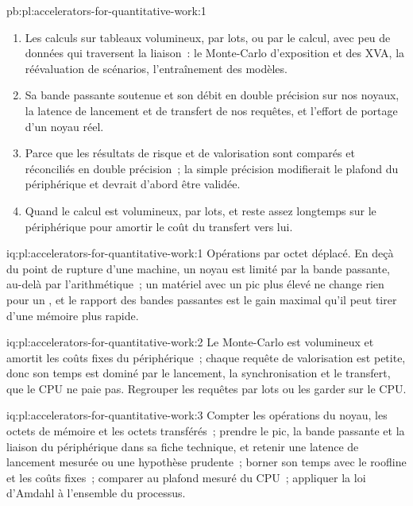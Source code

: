 \begin{solution}{pb:pl:accelerators-for-quantitative-work:1}
\begin{enumerate}
latence de lancement de 10~microsecondes.
\item Les calculs sur tableaux volumineux, par lots,  ou par le calcul, avec peu de données qui traversent la liaison~: le Monte-Carlo d'exposition et des XVA, la réévaluation de scénarios,
l'entraînement des modèles.
\item Sa bande passante soutenue et son débit en double précision sur nos noyaux, la latence de lancement et de transfert de nos requêtes, et l'effort de
portage d'un noyau réel.
\item Parce que les résultats de risque et de valorisation sont comparés et réconciliés en double précision~; la simple précision modifierait le plafond du périphérique et
devrait d'abord être validée.
\item Quand le calcul est volumineux, par lots, et reste assez longtemps sur le périphérique pour amortir le coût du transfert vers lui.
\end{enumerate}
\end{solution}

\begin{solution}{iq:pl:accelerators-for-quantitative-work:1}
Opérations par octet déplacé. En deçà du point de rupture d'une machine, un noyau est limité par la bande passante, au-delà par l'arithmétique~; un matériel avec un pic plus élevé
ne change rien pour un , et le rapport des bandes passantes est le gain maximal qu'il peut tirer d'une mémoire plus rapide.
\end{solution}

\begin{solution}{iq:pl:accelerators-for-quantitative-work:2}
Le Monte-Carlo est volumineux et amortit les coûts fixes du périphérique~; chaque requête de valorisation est petite, donc son temps est dominé par le lancement,
la synchronisation et le transfert, que le CPU ne paie pas. Regrouper les requêtes par lots ou les garder sur le CPU.
\end{solution}

\begin{solution}{iq:pl:accelerators-for-quantitative-work:3}
Compter les opérations du noyau, les octets de mémoire et les octets transférés~; prendre le pic, la bande passante et la liaison du périphérique dans sa fiche technique, et retenir une
latence de lancement mesurée ou une hypothèse prudente~; borner son temps avec le roofline et les coûts fixes~; comparer au plafond
mesuré du CPU~; appliquer la loi d'Amdahl à l'ensemble du processus.
\end{solution}

